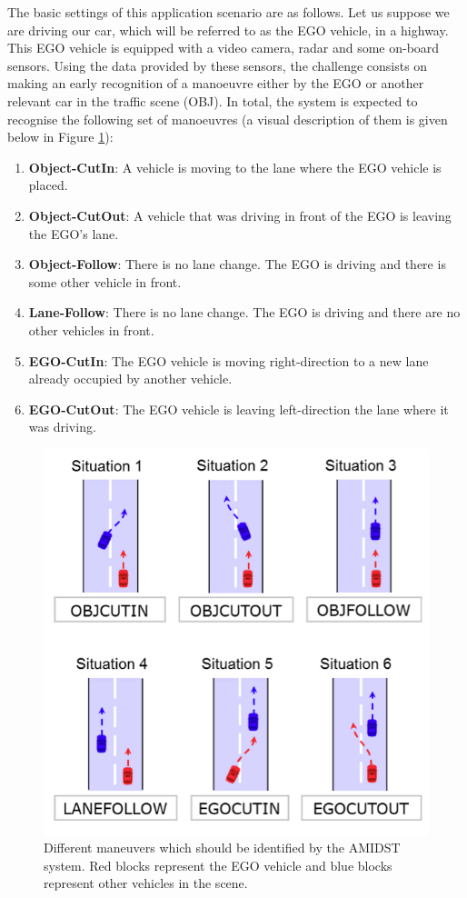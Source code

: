 The basic settings of this application scenario are as follows. Let us suppose we are driving our car, which will be referred to as the EGO vehicle, in a highway. This EGO vehicle is equipped with a video camera, radar and some on-board sensors.  Using the data provided by these sensors, the challenge consists on making an early recognition of a manoeuvre either by the EGO or another relevant car in the traffic scene (OBJ). In total, the system is expected to recognise the following set of manoeuvres (a visual description of them is given below in Figure \ref{Figure:DaimlerManeuvers}):
\begin{enumerate}
\item \textbf{Object-CutIn}: A vehicle is moving to the lane where the EGO vehicle is placed.
\item \textbf{Object-CutOut}:  A vehicle that was driving in front of the EGO is leaving the EGO's lane.
\item \textbf{Object-Follow}: There is no lane change. The EGO is driving and there is some other vehicle in front.
\item \textbf{Lane-Follow}: There is no lane change. The EGO is driving and there are no other vehicles in front.
\item \textbf{EGO-CutIn}: The EGO vehicle is moving right-direction to a new lane already occupied by another vehicle. 
\item \textbf{EGO-CutOut}: The EGO vehicle is leaving left-direction the lane where it was driving.
\end{enumerate}

\begin{figure}
\begin{center}
\includegraphics[scale=0.4]{./figures/DaimlerManeuvers}
\caption{\label{Figure:DaimlerManeuvers}Different maneuvers which should be identified by the AMIDST system.  Red blocks represent the EGO vehicle and blue blocks represent other vehicles in the scene.
}
\end{center}
\end{figure}


